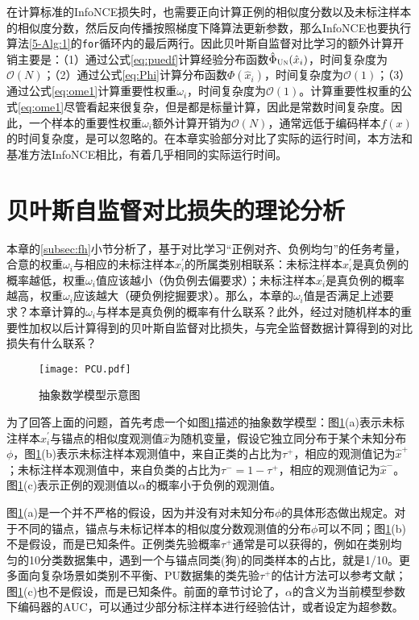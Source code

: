 在计算标准的InfoNCE损失时，也需要正向计算正例的相似度分数以及未标注样本的相似度分数，然后反向传播按照梯度下降算法更新参数，那么InfoNCE也要执行算法\ref{5-Alg:1}的\verb|for|循环内的最后两行。因此贝叶斯自监督对比学习的额外计算开销主要是：（1）通过公式\eqref{eq:puedf}计算经验分布函数$\hat \Phi_{\textsc{Un}} (\hat{x}_i)$，时间复杂度为$\mathcal{O}(N)$；（2）通过公式\eqref{eq:Phi}计算分布函数$\Phi(\hat{x}_i)$，时间复杂度为$\mathcal{O}(1)$；（3）通过公式\eqref{eq:ome1}计算重要性权重$\omega_i$，时间复杂度为$\mathcal{O}(1)$。计算重要性权重的公式\eqref{eq:ome1}尽管看起来很复杂，但是都是标量计算，因此是常数时间复杂度。因此，一个样本的重要性权重$\omega_i$额外计算开销为$\mathcal{O}(N)$，通常远低于编码样本$f(x)$的时间复杂度，是可以忽略的。在本章实验部分对比了实际的运行时间，本方法和基准方法InfoNCE相比，有着几乎相同的实际运行时间。

\section{贝叶斯自监督对比损失的理论分析}
本章的\ref{subsec:fh}小节分析了，基于对比学习“正例对齐、负例均匀”的任务考量，合意的权重$\omega_i$与相应的未标注样本$x^\prime_i$的所属类别相联系：未标注样本$x^\prime_i$是真负例的概率越低，权重$\omega_i$值应该越小（伪负例去偏要求）；未标注样本$x^\prime_i$是真负例的概率越高，权重$\omega_i$应该越大（硬负例挖掘要求）。那么，本章的$\omega_i$值是否满足上述要求？本章计算的$\omega_i$与样本是真负例的概率有什么联系？此外，经过对随机样本的重要性加权以后计算得到的贝叶斯自监督对比损失，与完全监督数据计算得到的对比损失有什么联系？
\begin{figure}[!]
	\centering
	\texttt{[image: PCU.pdf]}
	\caption{抽象数学模型示意图}
	\label{Fig:formulation}
\end{figure}

为了回答上面的问题，首先考虑一个如图\ref{Fig:formulation}描述的抽象数学模型：图\ref{Fig:formulation}(a)表示未标注样本$x^\prime_i$与锚点的相似度观测值$\hat{x}$为随机变量，假设它独立同分布于某个未知分布$\phi$，图\ref{Fig:formulation}(b)表示未标注样本观测值中，来自正类的占比为$\tau^+$，相应的观测值记为$\hat{x}^+$；未标注样本观测值中，来自负类的占比为$\tau^- = 1-\tau^+$，相应的观测值记为$\hat{x}^-$。图\ref{Fig:formulation}(c)表示正例的观测值以$\alpha$的概率小于负例的观测值。

图\ref{Fig:formulation}(a)是一个并不严格的假设，因为并没有对未知分布$\phi$的具体形态做出规定。对于不同的锚点，锚点与未标记样本的相似度分数观测值的分布$\phi$可以不同；图\ref{Fig:formulation}(b)不是假设，而是已知条件。正例类先验概率$\tau^+$通常是可以获得的，例如在类别均匀的10分类数据集中，遇到一个与锚点同类(狗)的同类样本的占比，就是1/10。更多面向复杂场景如类别不平衡、PU数据集的类先验$\tau^+$的估计方法可以参考文献\cite{Jain:2016:NIPS,Christoffel:2016:ACML}；图\ref{Fig:formulation}(c)也不是假设，而是已知条件。前面的章节讨论了，$\alpha$的含义为当前模型参数下编码器的AUC，可以通过少部分标注样本进行经验估计，或者设定为超参数。

